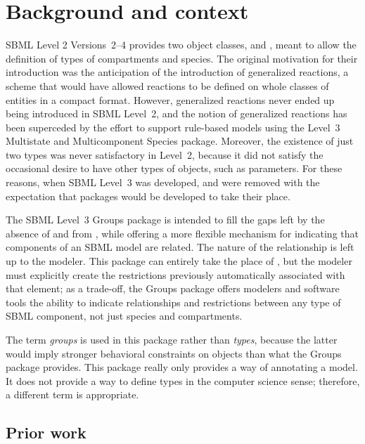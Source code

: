 
\section{Background and context}
\label{background}

SBML Level 2 Versions~2--4 provides two object classes, \CompartmentType and \SpeciesType, meant to allow the definition of types of compartments and species. The original motivation for their introduction was the anticipation of the introduction of generalized reactions, a scheme that would have allowed reactions to be defined on whole classes of entities in a compact format. However, generalized reactions never ended up being introduced in SBML Level~2, and the notion of generalized reactions has been superceded by the effort to support rule-based models using the Level~3 Multistate and Multicomponent Species package.  Moreover, the existence of just two types was never satisfactory in Level~2, because it did not satisfy the occasional desire to have other types of objects, such as parameters.  For these reasons, when SBML Level~3 was developed, \CompartmentType and \SpeciesType were removed with the expectation that packages would be developed to take their place.

The SBML Level~3 Groups package is intended to fill the gaps left by the absence of \CompartmentType and \SpeciesType from \sbmlthreecore, while offering a more flexible mechanism for indicating that components of an SBML model are related.  The nature of the relationship is left up to the modeler.  This package can entirely take the place of \SpeciesType, but the modeler must explicitly create the restrictions previously automatically associated with that element; as a trade-off, the Groups package offers modelers and software tools the ability to indicate relationships and restrictions between any type of SBML component, not just species and compartments.

The term \emph{groups} is used in this package rather than \emph{types}, because the latter would imply stronger behavioral constraints on objects than what the Groups package provides. This package really only provides a way of annotating a model.  It does not provide a way to define types in the computer science sense; therefore, a different term is appropriate.


\subsection{Prior work}

